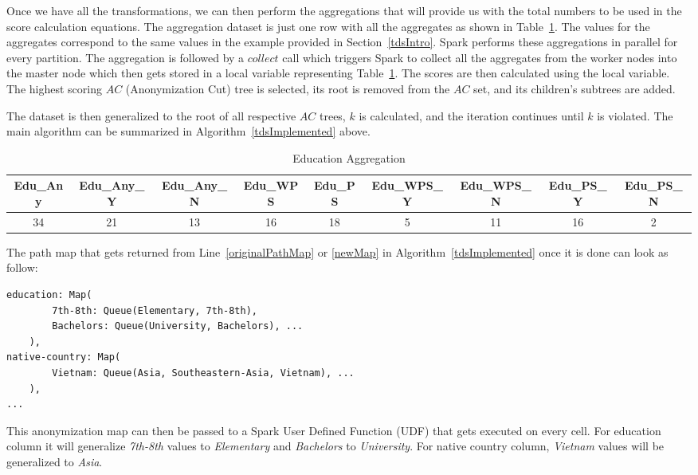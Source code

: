 \documentclass[11pt]{article}       %
\begin{document}
Once we have all the transformations, we can then perform the aggregations that will provide us with the total numbers to be used in the score calculation equations. The aggregation dataset is just one row with all the aggregates as shown in Table~\ref{table4}. The values for the aggregates correspond to the same values in the example provided in Section~\ref{tdsIntro}. Spark performs these aggregations in parallel for every partition. The aggregation is followed by a $collect$ call which triggers Spark to collect all the aggregates from the worker nodes into the master node which then gets stored in a local variable representing Table~\ref{table4}. The scores are then calculated using the local variable. The highest scoring $AC$ (Anonymization Cut) tree is selected, its root is removed from the $AC$ set, and its children's subtrees are added.

The dataset is then generalized to the root of all respective $AC$ trees, $k$ is calculated, and the iteration continues until $k$ is violated. The main algorithm can be summarized in Algorithm~\ref{tdsImplemented} above.

\begin{table}[htp]
\begin{adjustbox}{width=\textwidth, center}
\begin{tabular}{|c|c|c|c|c|c|c|c|c|}
\hline
Edu\_Any & Edu\_Any\_Y & Edu\_Any\_N & Edu\_WPS & Edu\_PS & Edu\_WPS\_Y & Edu\_WPS\_N & Edu\_PS\_Y & Edu\_PS\_N\\
\hline
34 & 21 & 13 & 16 & 18 & 5 & 11 & 16 & 2\\
\hline
\end{tabular}
\end{adjustbox}
\caption{Education Aggregation}
\label{table4}
\end{table}

The path map that gets returned from Line~\ref{originalPathMap} or \ref{newMap} in Algorithm~\ref{tdsImplemented} once it is done can look as follow:
\begin{verbatim}
education: Map(
        7th-8th: Queue(Elementary, 7th-8th),
        Bachelors: Queue(University, Bachelors), ...
    ),
native-country: Map(
        Vietnam: Queue(Asia, Southeastern-Asia, Vietnam), ...
    ),
...
\end{verbatim}
This anonymization map can then be passed to a Spark User Defined Function (UDF) that gets executed on every cell. For education column it will generalize \emph{7th-8th} values to \emph{Elementary} and \emph{Bachelors} to \emph{University}. For native country column, \emph{Vietnam} values will be generalized to \emph{Asia}.
\end{document}
